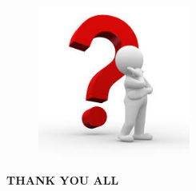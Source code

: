 \documentclass{beamer}
\begin{document}
\begin{frame}
 \begin{figure}
  \includegraphics[width=5cm]{question.jpg}
\end{figure}
 
\end{frame}
\begin{frame}
\begin{center}
 
 \textbf{THANK YOU ALL}
 \end{center}
\end{frame}
\end{document}
